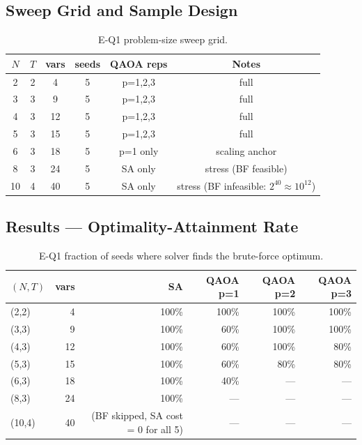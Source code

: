 \subsection{Sweep Grid and Sample Design}

\begin{table}[h!]
\centering
\caption{E-Q1 problem-size sweep grid.}
\label{tab:eq1_grid}
\begin{tabular}{cccccc}
\hline
\textbf{$N$} & \textbf{$T$} & \textbf{vars} & \textbf{seeds} & \textbf{QAOA reps} & \textbf{Notes} \\
\hline
2 &  2 &  4 & 5 & p=1,2,3 & full \\
3 &  3 &  9 & 5 & p=1,2,3 & full \\
4 &  3 & 12 & 5 & p=1,2,3 & full \\
5 &  3 & 15 & 5 & p=1,2,3 & full \\
6 &  3 & 18 & 5 & p=1 only & scaling anchor \\
8 &  3 & 24 & 5 & SA only & stress (BF feasible) \\
10 &  4 & 40 & 5 & SA only & stress (BF infeasible: $2^{40} \approx 10^{12}$) \\
\hline
\end{tabular}
\end{table}

\subsection{Results --- Optimality-Attainment Rate}

\begin{table}[h!]
\centering
\caption{E-Q1 fraction of seeds where solver finds the brute-force optimum.}
\label{tab:eq1_optrate}
\begin{tabular}{lrrrrr}
\hline
\textbf{$(N, T)$} & \textbf{vars} & \textbf{SA} & \textbf{QAOA p=1} & \textbf{QAOA p=2} & \textbf{QAOA p=3} \\
\hline
(2,2)  &  4 & 100\% & 100\% & 100\% & 100\% \\
(3,3)  &  9 & 100\% &  60\% & 100\% & 100\% \\
(4,3)  & 12 & 100\% &  60\% & 100\% &  80\% \\
(5,3)  & 15 & 100\% &  60\% &  80\% &  80\% \\
(6,3)  & 18 & 100\% &  40\% & --- & --- \\
(8,3)  & 24 & 100\% & --- & --- & --- \\
(10,4) & 40 & (BF skipped, SA cost = 0 for all 5) & --- & --- & --- \\
\hline
\end{tabular}
\end{table}

